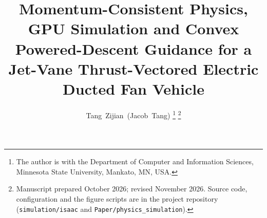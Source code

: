 \documentclass[journal]{IEEEtran}
\begin{document}
\title{Momentum-Consistent Physics, GPU Simulation and Convex Powered-Descent Guidance for a Jet-Vane Thrust-Vectored Electric Ducted Fan Vehicle}

\author{Tang~Zijian~(Jacob~Tang)%
\thanks{The author is with the Department of Computer and Information Sciences, Minnesota State University, Mankato, MN, USA.}%
\thanks{Manuscript prepared October 2026; revised November 2026. Source code, configuration and the figure scripts are in the project repository (\texttt{simulation/isaac} and \texttt{Paper/physics\_simulation}).}}


\maketitle
\end{document}
